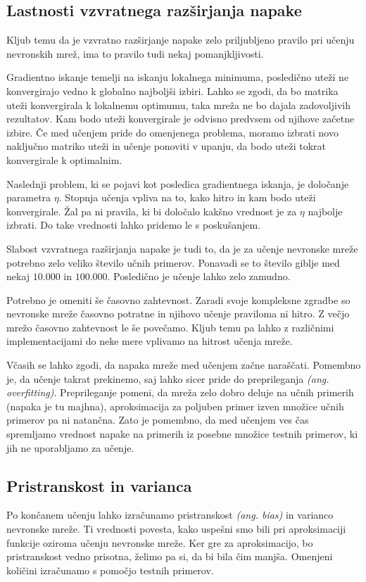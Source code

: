 \documentclass[mat1]{fmfdelo}
\begin{document}
\subsection{Lastnosti vzvratnega razširjanja napake}
Kljub temu da je vzvratno razširjanje napake zelo priljubljeno pravilo pri učenju nevronskih mrež, ima to pravilo tudi nekaj pomanjkljivosti. 

Gradientno iskanje temelji na iskanju lokalnega minimuma, posledično uteži ne konvergirajo vedno k globalno najboljši izbiri. Lahko se zgodi, da bo matrika uteži konvergirala k lokalnemu optimumu, taka mreža ne bo dajala zadovoljivih rezultatov. Kam bodo uteži konvergirale je odvisno predvsem od njihove začetne izbire. Če med učenjem pride do omenjenega problema, moramo izbrati novo naključno matriko uteži in učenje ponoviti v upanju, da bodo uteži tokrat konvergirale k optimalnim.

Naslednji problem, ki se pojavi kot posledica gradientnega iskanja, je določanje parametra $\eta$. Stopnja učenja vpliva na to, kako hitro in kam bodo uteži konvergirale. Žal pa ni pravila, ki bi določalo kakšno vrednost je za $\eta$ najbolje izbrati. Do take vrednosti lahko pridemo le s poskušanjem.

Slabost vzvratnega razširjanja napake je tudi to, da je za učenje nevronske mreže potrebno zelo veliko število učnih primerov. Ponavadi se to število giblje med nekaj $10.000$ in $100.000$. Posledično je učenje lahko zelo zamudno.

Potrebno je omeniti še časovno zahtevnost. Zaradi svoje kompleksne zgradbe so nevronske mreže časovno potratne in njihovo učenje praviloma ni hitro. Z večjo mrežo časovno zahtevnost le še povečamo. Kljub temu pa lahko z različnimi implementacijami do neke mere vplivamo na hitrost učenja mreže.

Včasih se lahko zgodi, da napaka mreže med učenjem začne naraščati. Pomembno je, da učenje takrat prekinemo, saj lahko sicer pride do preprileganja \emph{(ang. overfitting)}. Preprileganje pomeni, da mreža zelo dobro deluje na učnih primerih (napaka je tu majhna), aproksimacija za poljuben primer izven množice učnih primerov pa ni natančna. Zato je pomembno, da med učenjem ves čas spremljamo vrednost napake na primerih iz posebne množice testnih primerov, ki jih ne uporabljamo za učenje.
%
\subsection{Pristranskost in varianca}
Po končanem učenju lahko izračunamo pristranskost \emph{(ang. bias)} in varianco nevronske mreže. Ti vrednosti povesta, kako uspešni smo bili pri aproksimaciji funkcije oziroma učenju nevronske mreže. Ker gre za aproksimacijo, bo pristranskost vedno prisotna, želimo pa si, da bi bila čim manjša. Omenjeni količini izračunamo s pomočjo testnih primerov.
\end{document}
